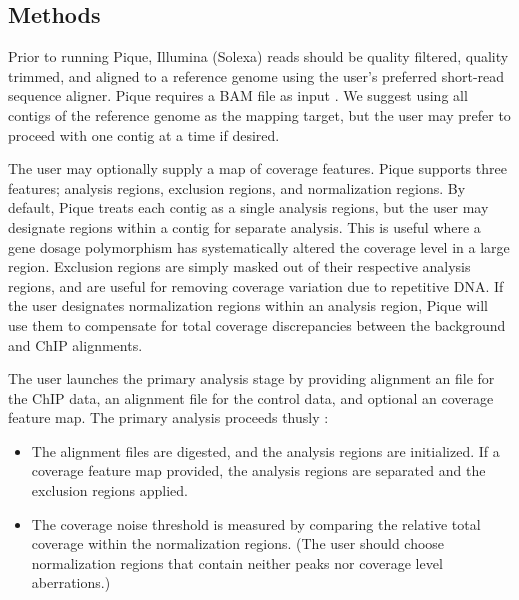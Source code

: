 \documentclass{bioinfo}
\begin{document}
\begin{methods}
\section{Methods}

\noindent Prior to running Pique, Illumina (Solexa) reads should be
quality filtered, quality trimmed, and aligned to a reference genome
using the user's preferred short-read sequence aligner. Pique requires
a BAM file as input \cite{sam_format}. We suggest using all contigs of
the reference genome as the mapping target, but the user may prefer to
proceed with one contig at a time if desired.

The user may optionally supply a map of coverage features. Pique
supports three features; analysis regions, exclusion regions, and
normalization regions. By default, Pique treats each contig as a
single analysis regions, but the user may designate regions within a
contig for separate analysis. This is useful where a gene dosage
polymorphism has systematically altered the coverage level in a large
region. Exclusion regions are simply masked out of their respective
analysis regions, and are useful for removing coverage variation due
to repetitive DNA. If the user designates normalization regions within
an analysis region, Pique will use them to compensate for total coverage
discrepancies between the background and ChIP alignments.

The user launches the primary analysis stage by providing alignment an
file for the ChIP data, an alignment file for the control data, and
optional an coverage feature map. The primary analysis proceeds thusly
:

\begin{itemize}

\item The alignment files are digested, and the analysis regions are
  initialized. If a coverage feature map provided, the analysis
  regions are separated and the exclusion regions applied.

\item The coverage noise threshold is measured by comparing the
  relative total coverage within the normalization regions. (The user
  should choose normalization regions that contain neither peaks nor
  coverage level aberrations.)

%


\end{itemize}
\end{methods}
\end{document}
